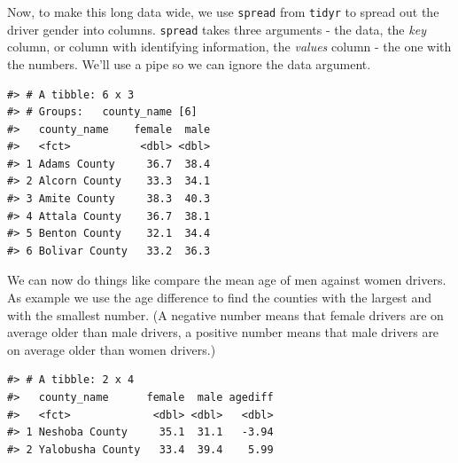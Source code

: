 \documentclass[]{book}
\newenvironment{Shaded}{\begin{snugshade}}{\end{snugshade}}
\newcommand{\DataTypeTok}[1]{\textcolor[rgb]{0.13,0.29,0.53}{#1}}
\newcommand{\KeywordTok}[1]{\textcolor[rgb]{0.13,0.29,0.53}{\textbf{#1}}}
\newcommand{\NormalTok}[1]{#1}
\newcommand{\OperatorTok}[1]{\textcolor[rgb]{0.81,0.36,0.00}{\textbf{#1}}}
\newcommand{\StringTok}[1]{\textcolor[rgb]{0.31,0.60,0.02}{#1}}
\begin{document}
Now, to make this long data wide, we use \texttt{spread} from \texttt{tidyr} to spread out the
driver gender into columns. \texttt{spread} takes three arguments - the data, the
\emph{key} column, or column with identifying information, the \emph{values} column - the
one with the numbers. We'll use a pipe so we can ignore the data argument.

\begin{Shaded}
\end{Shaded}

\begin{verbatim}
#> # A tibble: 6 x 3
#> # Groups:   county_name [6]
#>   county_name    female  male
#>   <fct>           <dbl> <dbl>
#> 1 Adams County     36.7  38.4
#> 2 Alcorn County    33.3  34.1
#> 3 Amite County     38.3  40.3
#> 4 Attala County    36.7  38.1
#> 5 Benton County    32.1  34.4
#> 6 Bolivar County   33.2  36.3
\end{verbatim}

We can now do things like compare the mean age of men against women drivers. As example we use the age difference to find the counties with the largest and with the smallest number. (A negative number means that female drivers are on average older than male drivers, a positive number means that male drivers are on average older than women drivers.)

\begin{Shaded}
\end{Shaded}

\begin{verbatim}
#> # A tibble: 2 x 4
#>   county_name      female  male agediff
#>   <fct>             <dbl> <dbl>   <dbl>
#> 1 Neshoba County     35.1  31.1   -3.94
#> 2 Yalobusha County   33.4  39.4    5.99
\end{verbatim}
\end{document}
